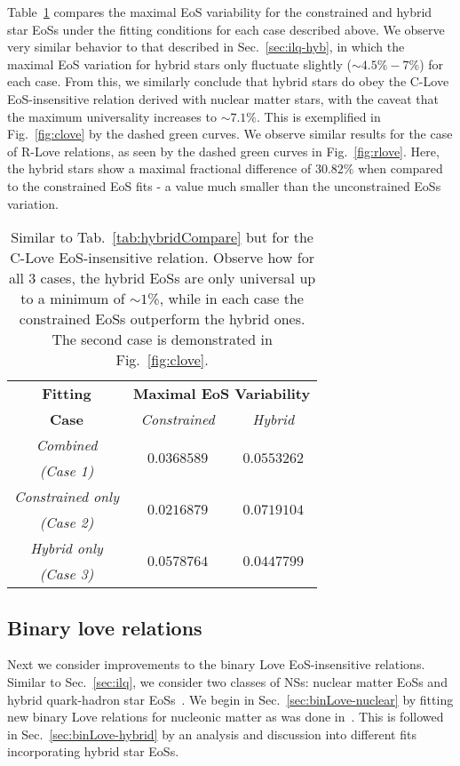\documentclass[prd,twocolumn,nofootinbib,superscriptaddress,amsmath,amssymb]{revtex4-1}
\begin{document}
Table~\ref{tab:hybridCompareClove} compares the maximal EoS variability for the constrained and hybrid star EoSs under the fitting conditions for each case described above. 
We observe very similar behavior to that described in Sec.~\ref{sec:ilq-hyb}, in which the maximal EoS variation for hybrid stars only fluctuate slightly ($\sim 4.5\% - 7\%$) for each case.
From this, we similarly conclude that hybrid stars do obey the C-Love EoS-insensitive relation derived with nuclear matter stars, with the caveat that the maximum universality increases to $\sim 7.1\%$.
This is exemplified in Fig.~\ref{fig:clove} by the dashed green curves.
We observe similar results for the case of R-Love relations, as seen by the dashed green curves in Fig.~\ref{fig:rlove}.
Here, the hybrid stars show a maximal fractional difference of $30.82\%$ when compared to the constrained EoS fits - a value much smaller than the unconstrained EoSs variation.

\begin{table}
\centering
\caption{
Similar to Tab.~\ref{tab:hybridCompare} but for the C-Love EoS-insensitive relation.
Observe how for all 3 cases, the hybrid EoSs are only universal up to a minimum of $\sim1$\%, while in each case the constrained EoSs outperform the hybrid ones.
The second case is demonstrated in Fig.~\ref{fig:clove}.
}\label{tab:hybridCompareClove}
\begin{tabular}{ c  || c c } 
 \hline
 \hline
 \textbf{Fitting} & \multicolumn{2}{c}{\textbf{Maximal EoS Variability}} \\
 \cline{2-3}
 \textbf{Case} &  \multicolumn{1}{c|}{\emph{Constrained}} & \emph{Hybrid}\\
 \hline
 \emph{Combined} &  \multirow{2}{*}{$0.0368589$} & \multirow{2}{*}{$0.0553262$}\\
 \emph{(Case 1)} & &\\
 \cline{1-1}
 \emph{Constrained only} & \multirow{2}{*}{$0.0216879$} & \multirow{2}{*}{$0.0719104$}\\
  \emph{(Case 2)} & &\\
  \cline{1-1}
 \emph{Hybrid only} & \multirow{2}{*}{$0.0578764$} & \multirow{2}{*}{$0.0447799$}\\
  \emph{(Case 3)} & &\\
  \cline{1-1}
\hline
\hline
\end{tabular}
\end{table}


\subsection{Binary love relations}\label{sec:binary}
Next we consider improvements to the binary Love EoS-insensitive relations.
Similar to Sec.~\ref{sec:ilq}, we consider two classes of NSs: nuclear matter EoSs and hybrid quark-hadron star EoSs~\cite{Paschalidis2018,Alford:2017qgh,1971SvA....15..347S,Zdunik:2012dj,Alford:2013aca}.
We begin in Sec.~\ref{sec:binLove-nuclear} by fitting new binary Love relations for nucleonic matter as was done in~\cite{Yagi:binLove}.
This is followed in Sec.~\ref{sec:binLove-hybrid} by an analysis and discussion into different fits incorporating hybrid star EoSs.
\end{document}
